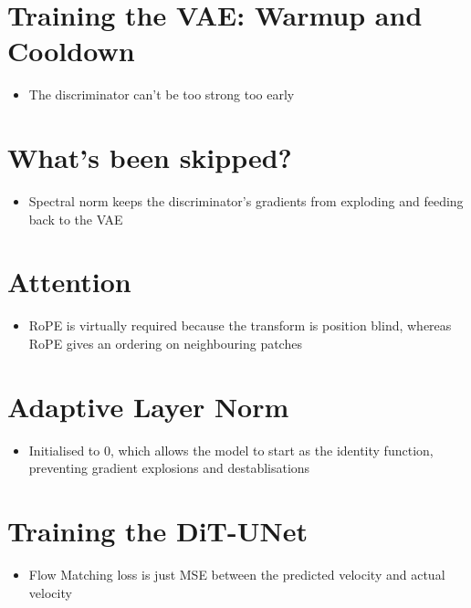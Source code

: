 \documentclass{article}
\begin{document}
\section*{Training the VAE: Warmup and Cooldown}

\begin{itemize}
    \item The discriminator can't be too strong too early
\end{itemize}

\section*{What's been skipped?}

\begin{itemize}
    \item Spectral norm keeps the discriminator's gradients from exploding and feeding back to the VAE
\end{itemize}

\section*{Attention}

\begin{itemize}
    \item RoPE is virtually required because the transform is position blind, whereas RoPE gives an ordering on neighbouring patches
\end{itemize}

\section*{Adaptive Layer Norm}

\begin{itemize}
    \item Initialised to 0, which allows the model to start as the identity function, preventing gradient explosions and destablisations
\end{itemize}

\section*{Training the DiT-UNet}

\begin{itemize}
    \item Flow Matching loss is just MSE between the predicted velocity and actual velocity
\end{itemize}
\end{document}
